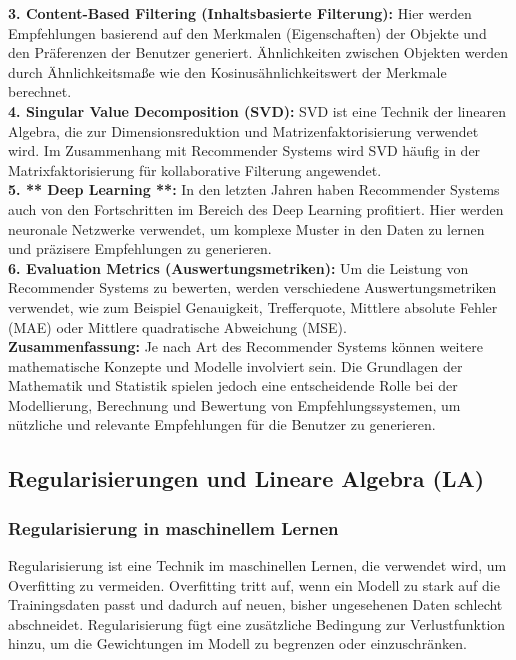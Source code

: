 \documentclass[12pt]{article}
\begin{document}
\textbf{3. Content-Based Filtering (Inhaltsbasierte Filterung):} Hier werden Empfehlungen basierend auf den Merkmalen (Eigenschaften) der Objekte und den Präferenzen der Benutzer generiert. Ähnlichkeiten zwischen Objekten werden durch Ähnlichkeitsmaße wie den Kosinusähnlichkeitswert der Merkmale berechnet.\\
\textbf{4. Singular Value Decomposition (SVD):} SVD ist eine Technik der linearen Algebra, die zur Dimensionsreduktion und Matrizenfaktorisierung verwendet wird. Im Zusammenhang mit Recommender Systems wird SVD häufig in der Matrixfaktorisierung für kollaborative Filterung angewendet.\\

\textbf{5. ** Deep Learning **:} In den letzten Jahren haben Recommender Systems auch von den Fortschritten im Bereich des Deep Learning profitiert. Hier werden neuronale Netzwerke verwendet, um komplexe Muster in den Daten zu lernen und präzisere Empfehlungen zu generieren.\\

\textbf{6. Evaluation Metrics (Auswertungsmetriken):} Um die Leistung von Recommender Systems zu bewerten, werden verschiedene Auswertungsmetriken verwendet, wie zum Beispiel Genauigkeit, Trefferquote, Mittlere absolute Fehler (MAE) oder Mittlere quadratische Abweichung (MSE).\\[0.2cm]

\textbf{Zusammenfassung:} Je nach Art des Recommender Systems können weitere mathematische Konzepte und Modelle involviert sein. Die Grundlagen der Mathematik und Statistik spielen jedoch eine entscheidende Rolle bei der Modellierung, Berechnung und Bewertung von Empfehlungssystemen, um nützliche und relevante Empfehlungen für die Benutzer zu generieren.\\


\newpage

\subsection{Regularisierungen und Lineare Algebra (LA)}

\subsubsection{Regularisierung in maschinellem Lernen}
Regularisierung ist eine Technik im maschinellen Lernen, die verwendet wird, um Overfitting zu vermeiden. Overfitting tritt auf, wenn ein Modell zu stark auf die Trainingsdaten passt und dadurch auf neuen, bisher ungesehenen Daten schlecht abschneidet. Regularisierung fügt eine zusätzliche Bedingung zur Verlustfunktion hinzu, um die Gewichtungen im Modell zu begrenzen oder einzuschränken.
\end{document}
